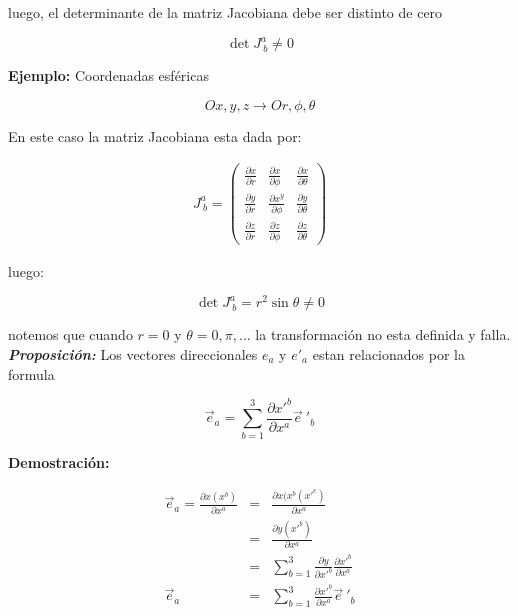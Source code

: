 \documentclass[12pt]{report}
\begin{document}
luego, el determinante de la matriz Jacobiana debe ser distinto de cero

\begin{equation} \label{2.87}
\det{J^a_{\ b }} \neq 0
\end{equation}


\textbf{Ejemplo:} Coordenadas esféricas 


\begin{equation}
O x,y,z \longrightarrow Or,\phi,\theta \nonumber
\end{equation}


En este caso la matriz Jacobiana esta dada por:

\begin{eqnarray} \nonumber
J^a_{\ b}
=
\left(
\begin{array}{ccc}
\displaystyle\frac{\partial x}{\partial r} & \displaystyle\frac{\partial x}{\partial \phi} & \displaystyle\frac{\partial x}{\partial \theta} \\
\displaystyle\frac{\partial y}{\partial r} & \displaystyle\frac{\partial x^y}{\partial \phi} & \displaystyle\frac{\partial y}{\partial \theta} \\
\displaystyle\frac{\partial z}{\partial r} & \displaystyle\frac{\partial z}{\partial \phi} & \displaystyle\frac{\partial z}{\partial \theta}
\end{array}
\right)
\end{eqnarray} 


luego:

\begin{equation} \label{2.88}
\det{J^a_{\ b}}=r^2 \sin{\theta} \neq 0
\end{equation}

notemos que cuando $r=0$ y $\theta=0,\pi,...$ la transformación no esta definida y falla. \\


\textbf{\textit{Proposición:}}  Los vectores direccionales $e_a$ y $e'_a$ estan relacionados por la formula

\begin{equation} \label{2.89}
\vec{e}_a = \sum_{b=1}^3 \frac{\partial x'^b}{\partial x^a} \vec{e}\ '_{b}
\end{equation}


\textbf{Demostración:} 

\begin{eqnarray} \nonumber
\vec{e}_a = \frac{\partial x(x^b)}{\partial x^a}&=&\frac{\partial x(x^b(x'^c)}{\partial x^a} \\ \nonumber
&=&\frac{\partial y(x'^b)}{\partial x^a} \\ \nonumber
&=&\sum_{b=1}^3 \frac{\partial y}{\partial x'^b}\frac{\partial x'^b}{\partial x^a} \\ \nonumber
\vec{e}_a&=&\sum_{b=1}^3 \frac{\partial x'^b}{\partial x^a} \vec{e}\ '_{b}
\end{eqnarray}
\end{document}
